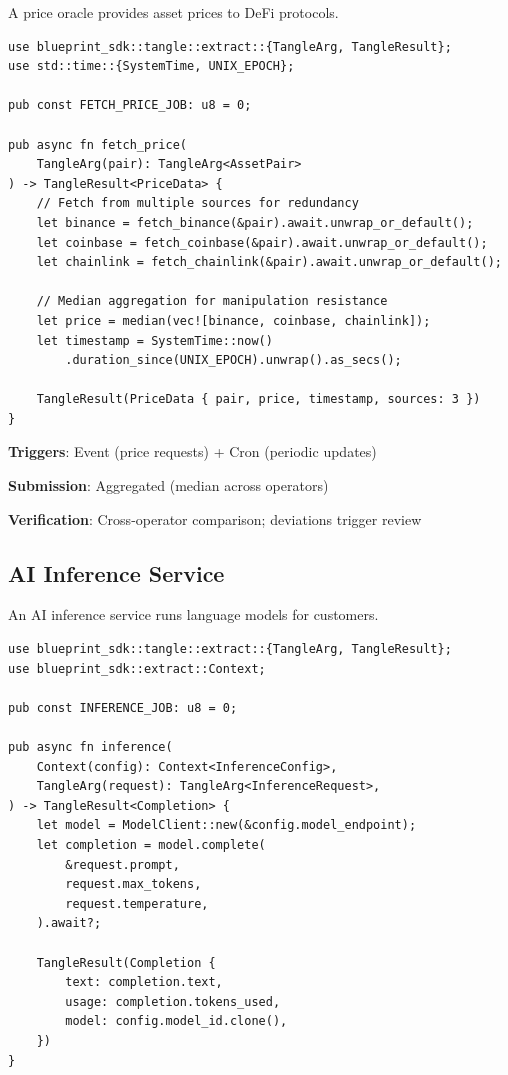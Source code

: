 \documentclass[11pt,a4paper]{article}
\begin{document}
A price oracle provides asset prices to DeFi protocols.

\begin{lstlisting}
use blueprint_sdk::tangle::extract::{TangleArg, TangleResult};
use std::time::{SystemTime, UNIX_EPOCH};

pub const FETCH_PRICE_JOB: u8 = 0;

pub async fn fetch_price(
    TangleArg(pair): TangleArg<AssetPair>
) -> TangleResult<PriceData> {
    // Fetch from multiple sources for redundancy
    let binance = fetch_binance(&pair).await.unwrap_or_default();
    let coinbase = fetch_coinbase(&pair).await.unwrap_or_default();
    let chainlink = fetch_chainlink(&pair).await.unwrap_or_default();

    // Median aggregation for manipulation resistance
    let price = median(vec![binance, coinbase, chainlink]);
    let timestamp = SystemTime::now()
        .duration_since(UNIX_EPOCH).unwrap().as_secs();

    TangleResult(PriceData { pair, price, timestamp, sources: 3 })
}
\end{lstlisting}

\textbf{Triggers}: Event (price requests) + Cron (periodic updates)

\textbf{Submission}: Aggregated (median across operators)

\textbf{Verification}: Cross-operator comparison; deviations trigger review

\subsection{AI Inference Service}

An AI inference service runs language models for customers.

\begin{lstlisting}
use blueprint_sdk::tangle::extract::{TangleArg, TangleResult};
use blueprint_sdk::extract::Context;

pub const INFERENCE_JOB: u8 = 0;

pub async fn inference(
    Context(config): Context<InferenceConfig>,
    TangleArg(request): TangleArg<InferenceRequest>,
) -> TangleResult<Completion> {
    let model = ModelClient::new(&config.model_endpoint);
    let completion = model.complete(
        &request.prompt,
        request.max_tokens,
        request.temperature,
    ).await?;

    TangleResult(Completion {
        text: completion.text,
        usage: completion.tokens_used,
        model: config.model_id.clone(),
    })
}
\end{lstlisting}
\end{document}

